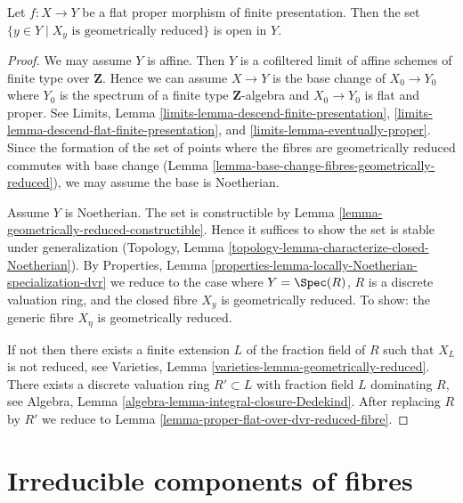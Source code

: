 \begin{lemma}
\label{lemma-geometrically-reduced-open}
Let $f : X \to Y$ be a flat proper morphism of finite presentation.
Then the set $\{y \in Y \mid X_y\text{ is geometrically reduced}\}$
is open in $Y$.
\end{lemma}

\begin{proof}
We may assume $Y$ is affine. Then $Y$ is a cofiltered limit of affine
schemes of finite type over $\mathbf{Z}$.
Hence we can assume $X \to Y$ is the
base change of $X_0 \to Y_0$ where $Y_0$ is the spectrum of a finite
type $\mathbf{Z}$-algebra and $X_0 \to Y_0$ is flat and proper.
See Limits, Lemma \ref{limits-lemma-descend-finite-presentation},
\ref{limits-lemma-descend-flat-finite-presentation}, and
\ref{limits-lemma-eventually-proper}. Since the formation of
the set of points where the fibres are geometrically
reduced commutes with base change
(Lemma \ref{lemma-base-change-fibres-geometrically-reduced}),
we may assume the base is Noetherian.

\medskip\noindent
Assume $Y$ is Noetherian. The set is constructible by
Lemma \ref{lemma-geometrically-reduced-constructible}.
Hence it suffices to show the set is stable under generalization
(Topology, Lemma \ref{topology-lemma-characterize-closed-Noetherian}). By
Properties, Lemma \ref{properties-lemma-locally-Noetherian-specialization-dvr}
we reduce to the case where $Y = \Spec(R)$, $R$ is a discrete
valuation ring, and the closed fibre $X_y$ is geometrically
reduced. To show: the generic fibre $X_\eta$ is geometrically reduced.

\medskip\noindent
If not then there exists a finite extension $L$ of the fraction
field of $R$ such that $X_L$ is not reduced, see
Varieties, Lemma \ref{varieties-lemma-geometrically-reduced}.
There exists a discrete valuation ring
$R' \subset L$ with fraction field $L$ dominating $R$, see
Algebra, Lemma \ref{algebra-lemma-integral-closure-Dedekind}.
After replacing $R$ by $R'$ we reduce to
Lemma \ref{lemma-proper-flat-over-dvr-reduced-fibre}.
\end{proof}







\section{Irreducible components of fibres}
\label{section-irreducible}

